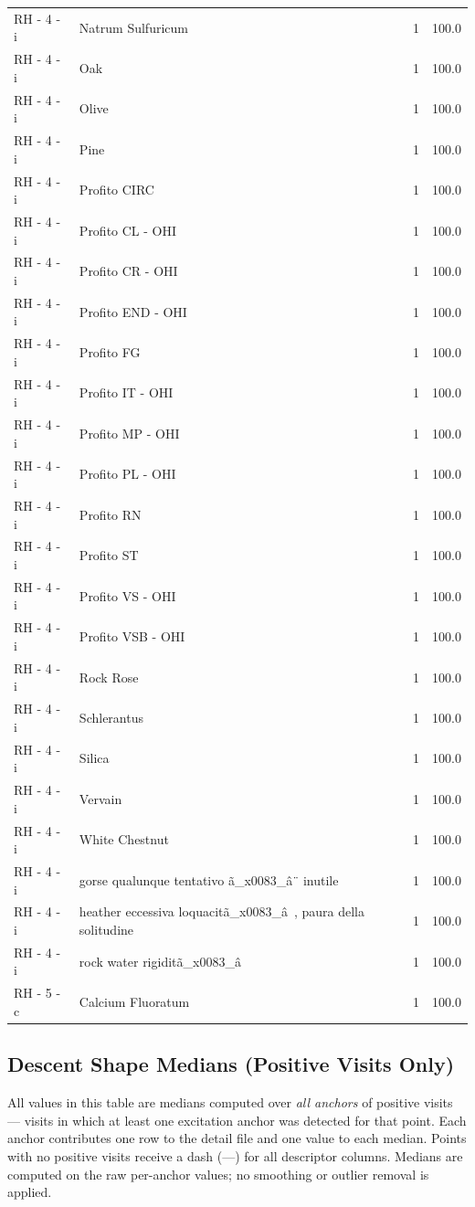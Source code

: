 \documentclass[a4paper,11pt]{article}
\begin{document}
\begin{footnotesize}
\begin{longtable}{p{3.5cm}p{7.5cm}rr}
RH - 4 - i & Natrum Sulfuricum & 1 & 100.0 \\
RH - 4 - i & Oak & 1 & 100.0 \\
RH - 4 - i & Olive & 1 & 100.0 \\
RH - 4 - i & Pine & 1 & 100.0 \\
RH - 4 - i & Profito CIRC & 1 & 100.0 \\
RH - 4 - i & Profito CL - OHI & 1 & 100.0 \\
RH - 4 - i & Profito CR - OHI & 1 & 100.0 \\
RH - 4 - i & Profito END - OHI & 1 & 100.0 \\
RH - 4 - i & Profito FG & 1 & 100.0 \\
RH - 4 - i & Profito IT - OHI & 1 & 100.0 \\
RH - 4 - i & Profito MP - OHI & 1 & 100.0 \\
RH - 4 - i & Profito PL - OHI & 1 & 100.0 \\
RH - 4 - i & Profito RN & 1 & 100.0 \\
RH - 4 - i & Profito ST & 1 & 100.0 \\
RH - 4 - i & Profito VS - OHI & 1 & 100.0 \\
RH - 4 - i & Profito VSB - OHI & 1 & 100.0 \\
RH - 4 - i & Rock Rose & 1 & 100.0 \\
RH - 4 - i & Schlerantus & 1 & 100.0 \\
RH - 4 - i & Silica & 1 & 100.0 \\
RH - 4 - i & Vervain & 1 & 100.0 \\
RH - 4 - i & White Chestnut & 1 & 100.0 \\
RH - 4 - i & gorse qualunque tentativo ã\_x0083\_â¨ inutile & 1 & 100.0 \\
RH - 4 - i & heather eccessiva loquacitã\_x0083\_â , paura della solitudine & 1 & 100.0 \\
RH - 4 - i & rock water rigiditã\_x0083\_â & 1 & 100.0 \\
RH - 5 - c & Calcium Fluoratum & 1 & 100.0 \\
\end{longtable}
\end{footnotesize}

\subsection{Descent Shape Medians (Positive Visits Only)}

All values in this table are medians computed over \emph{all anchors} of positive visits ---
visits in which at least one excitation anchor was detected for that point. Each anchor
contributes one row to the detail file and one value to each median. Points with no positive
visits receive a dash (---) for all descriptor columns.
Medians are computed on the raw per-anchor values; no smoothing or outlier removal is
applied.
\end{document}
